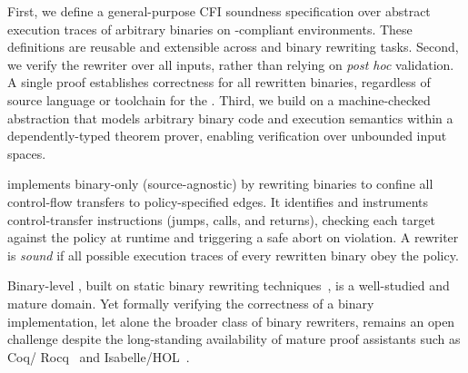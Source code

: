 {%
  First, we define a general-purpose CFI soundness specification over abstract execution traces of arbitrary binaries on \isa-compliant environments. These definitions are reusable and extensible across \isas and binary rewriting tasks.
  Second, we verify the rewriter over all inputs, rather than relying on \textit{post hoc} validation. A single proof establishes correctness for all rewritten binaries, regardless of source language or toolchain for the \isa.
  Third, we build \pname on a machine-checked abstraction that models arbitrary binary code and execution semantics within a dependently-typed theorem prover, enabling verification over unbounded input spaces.
}

\pname implements binary-only (source-agnostic) \cfi by rewriting binaries to confine all control-flow transfers to policy-specified edges. It identifies and instruments control-transfer instructions (\eg jumps, calls, and returns), checking each target against the policy at runtime and triggering a safe abort on violation.
 A \cfi rewriter is \emph{sound} if all possible execution traces of every rewritten binary obey the policy.

Binary-level \cfi, built on static binary rewriting techniques~\cite{rewriter0, rewriter1, rewriter2,reassessor2023sec}, is a well-studied and mature domain. Yet formally verifying the correctness of a binary \cfi implementation, let alone the broader class of binary rewriters, remains an open challenge despite the long-standing availability of mature proof assistants such as Coq/ Rocq~\cite{rocq} and Isabelle/HOL~\cite{hol}.

